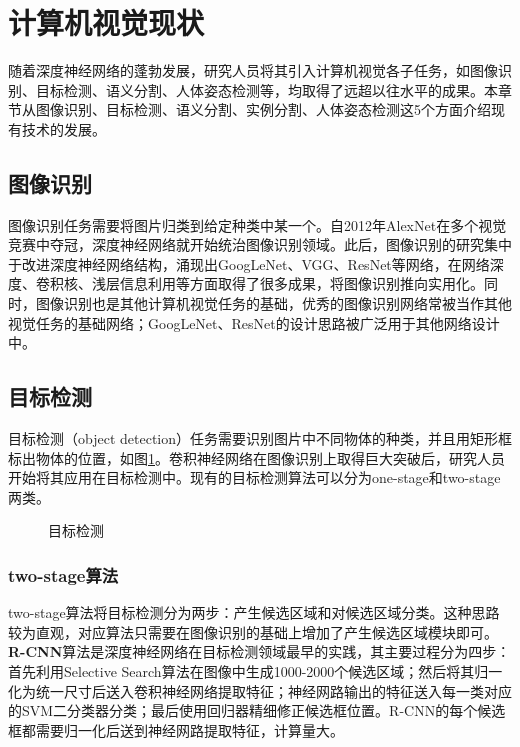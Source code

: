 \section{计算机视觉现状}

随着深度神经网络的蓬勃发展，研究人员将其引入计算机视觉各子任务，如图像识别、目标检测、语义分割、人体姿态检测等，均取得了远超以往水平的成果。本章节从图像识别、目标检测、语义分割、实例分割、人体姿态检测这5个方面介绍现有技术的发展。

\subsection{图像识别}
图像识别任务需要将图片归类到给定种类中某一个。自2012年AlexNet在多个视觉竞赛中夺冠，深度神经网络就开始统治图像识别领域。此后，图像识别的研究集中于改进深度神经网络结构，涌现出GoogLeNet、VGG、ResNet等网络，在网络深度、卷积核、浅层信息利用等方面取得了很多成果，将图像识别推向实用化。同时，图像识别也是其他计算机视觉任务的基础，优秀的图像识别网络常被当作其他视觉任务的基础网络；GoogLeNet、ResNet的设计思路被广泛用于其他网络设计中。

\subsection{目标检测}
目标检测（object detection）任务需要识别图片中不同物体的种类，并且用矩形框标出物体的位置，如图\ref{fig:目标检测}。卷积神经网络在图像识别上取得巨大突破后，研究人员开始将其应用在目标检测中。现有的目标检测算法可以分为one-stage和two-stage两类。
\begin{figure}
    \centering
    \caption{目标检测}
    \label{fig:目标检测}
\end{figure}

\subsubsection{two-stage算法}
two-stage算法将目标检测分为两步：产生候选区域和对候选区域分类。这种思路较为直观，对应算法只需要在图像识别的基础上增加了产生候选区域模块即可。
\textbf{R-CNN}\cite{girshick2014rich}算法是深度神经网络在目标检测领域最早的实践，其主要过程分为四步：首先利用Selective Search算法在图像中生成1000-2000个候选区域；然后将其归一化为统一尺寸后送入卷积神经网络提取特征；神经网路输出的特征送入每一类对应的SVM二分类器分类；最后使用回归器精细修正候选框位置。R-CNN的每个候选框都需要归一化后送到神经网路提取特征，计算量大。


